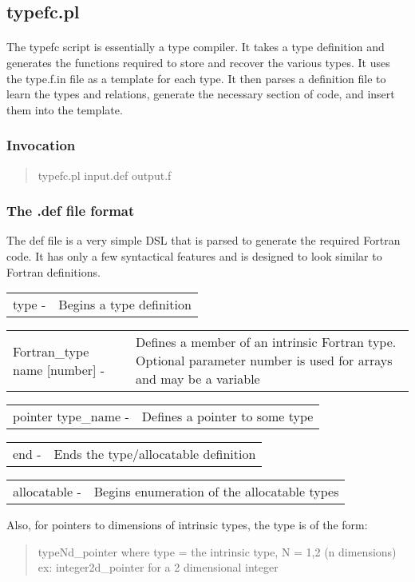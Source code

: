 \documentclass{article}
\begin{document}
\subsection{typefc.pl}
\label{sec.typefc}
\paragraph{}
The typefc script is essentially a type compiler. It takes a type definition and generates the functions required to store and recover the various types. It uses the type.f.in file as a template for each type. It then parses a definition file to learn the types and relations, generate the necessary section of code, and insert them into the template.
\subsubsection{Invocation}
\begin{quote}
   typefc.pl input.def output.f
\end{quote}
\subsubsection{The .def file format}
\newcommand{\syn}[2]{
   \begin{tabular}{lp{0.7\textwidth}}
      #1 - & #2
   \end{tabular}
}
The def file is a very simple DSL that is parsed to generate the required Fortran code. It has only a few syntactical features and is designed to look similar to Fortran definitions.
\begin{list}{}{}
\item \syn {type}{Begins a type definition}
\item \syn{Fortran\_type name [number]}{Defines a member of an intrinsic Fortran type. Optional parameter number is used for arrays and may be a variable}
\item \syn{pointer type\_name}{Defines a pointer to some type}
\item \syn{end}{Ends the type/allocatable definition}
\item \syn{allocatable}{Begins enumeration of the allocatable types}
\end{list}
Also, for pointers to dimensions of intrinsic types, the type is of the form:
\begin{quote}
   typeNd\_pointer where type = the intrinsic type, N = 1,2 (n dimensions) \\
   ex: integer2d\_pointer for a 2 dimensional integer
\end{quote}
\end{document}
